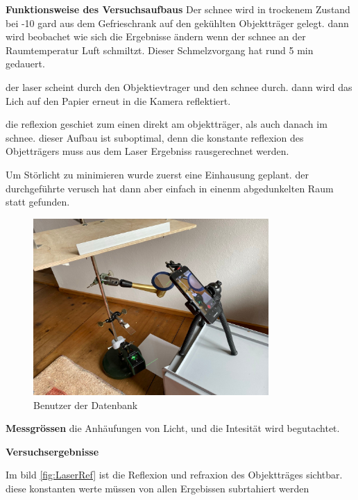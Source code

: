 \textbf{Funktionsweise des Versuchsaufbaus}
Der schnee wird in trockenem Zustand bei -10 gard aus dem Gefrieschrank auf den gekühlten Objektträger gelegt. dann wird beobachet wie sich die Ergebnisse ändern wenn der schnee an der Raumtemperatur Luft schmiltzt. Dieser Schmelzvorgang hat rund 5 min gedauert.

der laser scheint durch den Objektievtrager und den schnee durch. dann wird das Lich auf den Papier erneut in die Kamera reflektiert.

die reflexion geschiet zum einen direkt am objektträger, als auch danach im schnee. dieser Aufbau ist suboptimal, denn die konstante reflexion des Objetträgers muss aus dem Laser Ergebniss rausgerechnet werden.

Um Störlicht zu minimieren wurde zuerst eine Einhausung geplant. der durchgeführte verusch hat dann aber einfach in einenm abgedunkelten Raum statt gefunden.

\begin{figure}
    \centering
    \includegraphics[width=0.8\textwidth]{Bilder/signal-2024-03-10-112013_006.jpeg}
    \caption{Benutzer der Datenbank}
    \label{fig:LaserAufbau}
\end{figure}



\textbf{Messgrössen}
die Anhäufungen von Licht, und die Intesität wird begutachtet.

\textbf{Versuchsergebnisse}

Im bild \ref{fig:LaserRef} ist die Reflexion und refraxion des Objektträges sichtbar. diese konstanten werte müssen von allen Ergebissen subrtahiert werden

